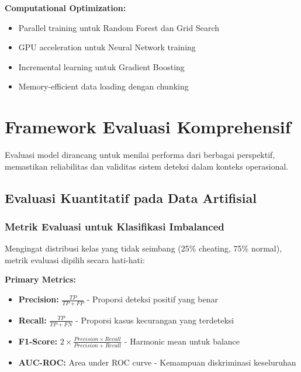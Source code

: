 \textbf{Computational Optimization:}
\begin{itemize}
    \item Parallel training untuk Random Forest dan Grid Search
    \item GPU acceleration untuk Neural Network training
    \item Incremental learning untuk Gradient Boosting
    \item Memory-efficient data loading dengan chunking
\end{itemize}

\section{Framework Evaluasi Komprehensif}
\label{sec:frameworkEvaluasi}

Evaluasi model dirancang untuk menilai performa dari berbagai perspektif, memastikan reliabilitas dan validitas sistem deteksi dalam konteks operasional.

\subsection{Evaluasi Kuantitatif pada Data Artifisial}
\label{sec:evaluasiKuantitatif}

\subsubsection{Metrik Evaluasi untuk Klasifikasi Imbalanced}
\label{sec:metrikEvaluasi}

Mengingat distribusi kelas yang tidak seimbang (25\% cheating, 75\% normal), metrik evaluasi dipilih secara hati-hati:

\textbf{Primary Metrics:}
\begin{itemize}
    \item \textbf{Precision:} $\frac{TP}{TP + FP}$ - Proporsi deteksi positif yang benar
    \item \textbf{Recall:} $\frac{TP}{TP + FN}$ - Proporsi kasus kecurangan yang terdeteksi
    \item \textbf{F1-Score:} $2 \times \frac{Precision \times Recall}{Precision + Recall}$ - Harmonic mean untuk balance
    \item \textbf{AUC-ROC:} Area under ROC curve - Kemampuan diskriminasi keseluruhan
\end{itemize}

